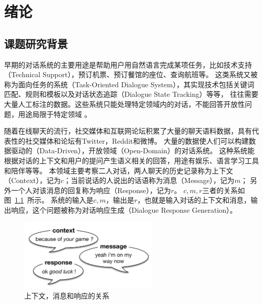 
\chapter{绪论}\label{ch:introduction}

\section{课题研究背景}\label{sec:research_background}
早期的对话系统的主要用途是帮助用户用自然语言完成某项任务，比如技术支持（Technical Support），预订机票、预订餐馆的座位、查询航班等。
这类系统又被称为面向任务的系统（Task-Oriented Dialogue System），其实现技术包括关键词匹配、规则和模板以及对话状态追踪（Dialogue State Tracking）等等，
往往需要大量人工标注的数据。这些系统只能处理特定领域内的对话，不能回答开放性问题，用途局限于特定领域
。

随着在线聊天的流行，社交媒体和互联网论坛积累了大量的聊天语料数据，具有代表性的社交媒体和论坛有Twitter，Reddit和微博。
大量的数据使人们可以构建数据驱动的（Data-Driven），开放领域（Open-Domain）的对话系统。
这种系统能根据对话的上下文和用户的提问产生语义相关的回答，用途有娱乐、语言学习工具和陪伴等等。
本领域主要考察二人对话，两人聊天的历史记录称为上下文（Context），记为$c$；当前说话的人说出的话语称为消息（Message），记为$m$；
另外一个人对该消息的回复称为响应（Response），记为$r$。
$c,m,r$三者的关系如图~\ref{fig:context_message_response}~所示。
系统的输入是$c, m$，输出是$r$，也就是输入对话的上下文和消息，输出响应，这个问题被称为对话响应生成（Dialogue Response Generation）。

\begin{figure}[H]
    \includegraphics[width=0.6\textwidth]{figure/context_message_response.png}
    \centering
    \caption{上下文，消息和响应的关系}
    \label{fig:context_message_response}
\end{figure}

